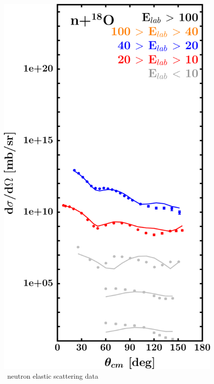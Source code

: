 \begin{figure}[H]
\begin{minipage}{0.45\textwidth}
        \includegraphics[width=1.0\textwidth]{figures/o18_neutronElastic.png}
        \caption{\oEight\ neutron elastic scattering data}
        \label{DOMFitData_o18_neutron_elastic}
    \end{minipage}
\end{figure}

